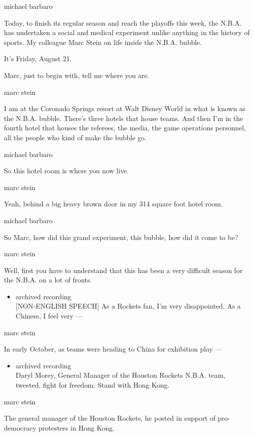 michael barbaro

Today, to finish its regular season and reach the playoffs this week,
the N.B.A. has undertaken a social and medical experiment unlike
anything in the history of sports. My colleague Marc Stein on life
inside the N.B.A. bubble.

It's Friday, August 21.

Marc, just to begin with, tell me where you are.

marc stein

I am at the Coronado Springs resort at Walt Disney World in what is
known as the N.B.A. bubble. There's three hotels that house teams. And
then I'm in the fourth hotel that houses the referees, the media, the
game operations personnel, all the people who kind of make the bubble
go.

michael barbaro

So this hotel room is where you now live.

marc stein

Yeah, behind a big heavy brown door in my 314 square foot hotel room.

michael barbaro

So Marc, how did this grand experiment, this bubble, how did it come to
be?

marc stein

Well, first you have to understand that this has been a very difficult
season for the N.B.A. on a lot of fronts.

\begin{itemize}
\tightlist
\item
  archived recording\\
  {[}NON-ENGLISH SPEECH{]} As a Rockets fan, I'm very disappointed. As a
  Chinese, I feel very ---
\end{itemize}

marc stein

In early October, as teams were heading to China for exhibition play ---

\begin{itemize}
\tightlist
\item
  archived recording\\
  Daryl Morey, General Manager of the Houston Rockets N.B.A. team,
  tweeted, fight for freedom. Stand with Hong Kong.
\end{itemize}

marc stein

The general manager of the Houston Rockets, he posted in support of
pro-democracy protesters in Hong Kong.

